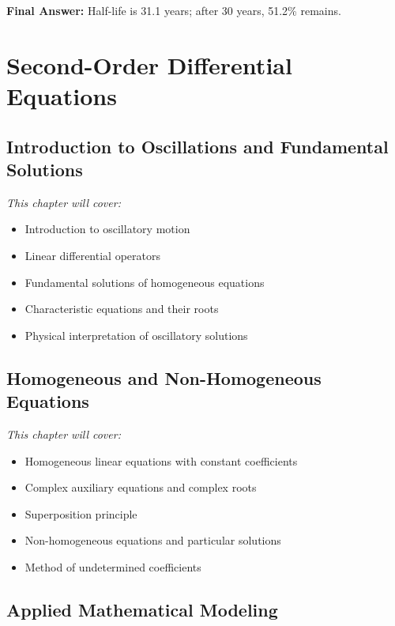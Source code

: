 \documentclass[12pt, letterpaper]{book}
\theoremstyle{problemstyle}
\theoremstyle{solutionstyle}
\begin{document}
\textbf{Final Answer:} Half-life is 31.1 years; after 30 years, 51.2\% remains.

\part{Second-Order Differential Equations}
\label{part:second_order_de}

\chapter{Introduction to Oscillations and Fundamental Solutions}
\label{chap:session_5}

\textit{This chapter will cover:}
\begin{itemize}
    \item Introduction to oscillatory motion
    \item Linear differential operators
    \item Fundamental solutions of homogeneous equations
    \item Characteristic equations and their roots
    \item Physical interpretation of oscillatory solutions
\end{itemize}

\chapter{Homogeneous and Non-Homogeneous Equations}
\label{chap:session_6}

\textit{This chapter will cover:}
\begin{itemize}
    \item Homogeneous linear equations with constant coefficients
    \item Complex auxiliary equations and complex roots
    \item Superposition principle
    \item Non-homogeneous equations and particular solutions
    \item Method of undetermined coefficients
\end{itemize}

\chapter{Applied Mathematical Modeling}
\label{chap:session_7}
\end{document}

